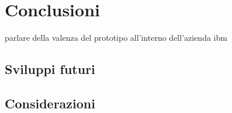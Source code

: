 \chapter{Conclusioni}
parlare della valenza del prototipo all'interno dell'azienda ibm
\section{Sviluppi futuri}
\section{Considerazioni}

